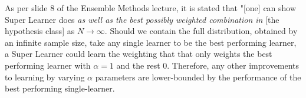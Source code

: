 \tftrue

As per slide 8 of the Ensemble Methods lecture, it is stated that "[one] can show Super Learner does \emph{as well as the best possibly weighted combination in} [the hypothesis class] as $N \rightarrow \infty$. Should we contain the full distribution, obtained by an infinite sample size, take any single learner to be the best performing learner, a Super Learner could learn the weighting that that only weights the best performing learner with $\alpha = 1$ and the rest $0$. Therefore, any other improvements to learning by varying $\alpha$ parameters are lower-bounded by the performance of the best performing single-learner.